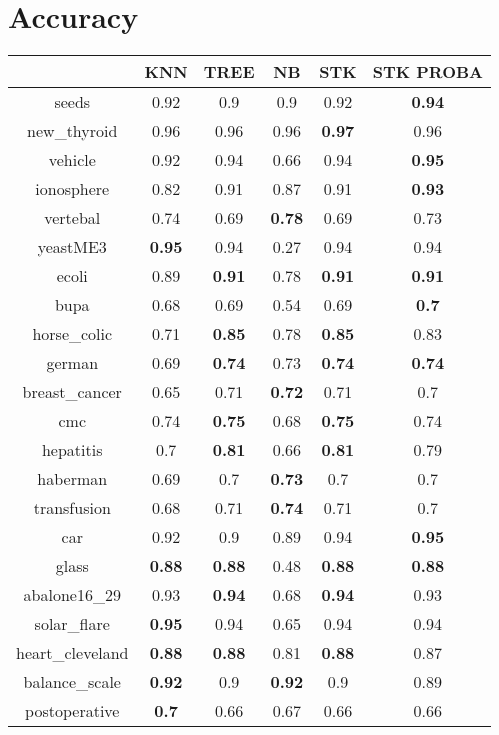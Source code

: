\documentclass{article}%
\begin{document}
%
\normalsize%
\section*{Accuracy}%
\begin{tabular}{c|ccccc}%
&KNN&TREE&NB&STK&STK PROBA\\%
\hline%
seeds&0.92&0.9&0.9&0.92&\textbf{0.94}\\%
new\_thyroid&0.96&0.96&0.96&\textbf{0.97}&0.96\\%
vehicle&0.92&0.94&0.66&0.94&\textbf{0.95}\\%
ionosphere&0.82&0.91&0.87&0.91&\textbf{0.93}\\%
vertebal&0.74&0.69&\textbf{0.78}&0.69&0.73\\%
yeastME3&\textbf{0.95}&0.94&0.27&0.94&0.94\\%
ecoli&0.89&\textbf{0.91}&0.78&\textbf{0.91}&\textbf{0.91}\\%
bupa&0.68&0.69&0.54&0.69&\textbf{0.7}\\%
horse\_colic&0.71&\textbf{0.85}&0.78&\textbf{0.85}&0.83\\%
german&0.69&\textbf{0.74}&0.73&\textbf{0.74}&\textbf{0.74}\\%
breast\_cancer&0.65&0.71&\textbf{0.72}&0.71&0.7\\%
cmc&0.74&\textbf{0.75}&0.68&\textbf{0.75}&0.74\\%
hepatitis&0.7&\textbf{0.81}&0.66&\textbf{0.81}&0.79\\%
haberman&0.69&0.7&\textbf{0.73}&0.7&0.7\\%
transfusion&0.68&0.71&\textbf{0.74}&0.71&0.7\\%
car&0.92&0.9&0.89&0.94&\textbf{0.95}\\%
glass&\textbf{0.88}&\textbf{0.88}&0.48&\textbf{0.88}&\textbf{0.88}\\%
abalone16\_29&0.93&\textbf{0.94}&0.68&\textbf{0.94}&0.93\\%
solar\_flare&\textbf{0.95}&0.94&0.65&0.94&0.94\\%
heart\_cleveland&\textbf{0.88}&\textbf{0.88}&0.81&\textbf{0.88}&0.87\\%
balance\_scale&\textbf{0.92}&0.9&\textbf{0.92}&0.9&0.89\\%
postoperative&\textbf{0.7}&0.66&0.67&0.66&0.66\\%
\end{tabular}

%
\end{document}
